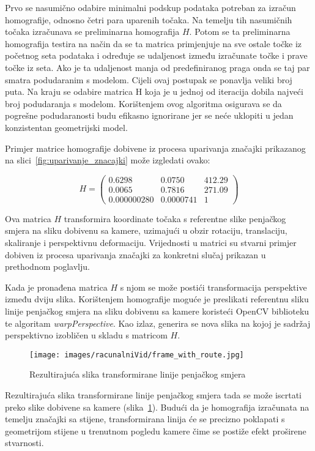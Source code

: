 Prvo se nasumično odabire minimalni podskup podataka potreban za izračun homografije, odnosno četri para uparenih točaka. Na temelju tih nasumičnih točaka izračunava se preliminarna homografija $H$. Potom se ta preliminarna homografija testira na način da se ta matrica primjenjuje na sve ostale točke iz početnog seta podataka i određuje se udaljenost između izračunate točke i prave točke iz seta. Ako je ta udaljenost manja od predefiniranog praga onda se taj par smatra podudaranim s modelom. Cijeli ovaj postupak se ponavlja veliki broj puta. 
Na kraju se odabire matrica H koja je u jednoj od iteracija dobila najveći broj podudaranja s modelom. Korištenjem ovog algoritma osigurava se da pogrešne podudaranosti budu efikasno ignorirane jer se neće uklopiti u jedan konzistentan geometrijski model.

Primjer matrice homografije dobivene iz procesa uparivanja značajki prikazanog na slici~\ref{fig:uparivanje_znacajki} može izgledati ovako:

\begin{equation}
    H =
    \begin{pmatrix}
        0.6298 & 0.0750 & 412.29 \\
        0.0065 & 0.7816 & 271.09 \\
        0.000000280 & 0.0000741 & 1
    \end{pmatrix}
\end{equation}

Ova matrica $H$ transformira koordinate točaka s referentne slike penjačkog smjera na sliku dobivenu sa kamere, uzimajući u obzir rotaciju, translaciju, skaliranje i perspektivnu deformaciju. Vrijednosti u matrici su stvarni primjer dobiven iz procesa uparivanja značajki za konkretni slučaj prikazan u prethodnom poglavlju.




Kada je pronađena matrica $H$ s njom se može postići transformacija perspektive između dviju slika. Korištenjem homografije moguće je preslikati referentnu sliku linije penjačkog smjera na sliku dobivenu sa kamere koristeći OpenCV biblioteku te algoritam \textit{warpPerspective}. Kao izlaz, generira se nova slika na kojoj je sadržaj perspektivno izobličen u skladu s matricom $H$. 

\begin{figure}[H]
    \centering
    \texttt{[image: images/racunalniVid/frame\_with\_route.jpg]}
    \caption{Rezultirajuća slika transformirane linije penjačkog smjera}
    \label{fig:transformacija_perspektive}
\end{figure}

Rezultirajuća slika transformirane linije penjačkog smjera tada se može iscrtati preko slike dobivene sa kamere (slika~\ref{fig:transformacija_perspektive}). Budući da je homografija izračunata na temelju značajki sa stijene, transformirana linija će se precizno poklapati s geometrijom stijene u trenutnom pogledu kamere čime se postiže efekt proširene stvarnosti.